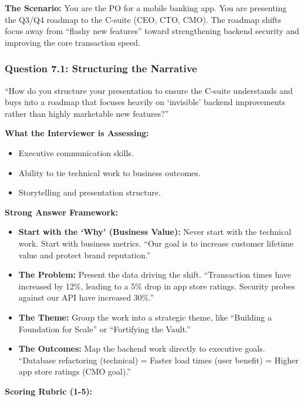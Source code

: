 \documentclass[
  11pt,
  openany,
  oneside]{book}
\providecommand{\tightlist}{%
  \setlength{\itemsep}{0pt}\setlength{\parskip}{0pt}}
\begin{document}
\textbf{The Scenario:} You are the PO for a mobile banking app. You are
presenting the Q3/Q4 roadmap to the C-suite (CEO, CTO, CMO). The roadmap
shifts focus away from ``flashy new features'' toward strengthening
backend security and improving the core transaction speed.

\subsubsection{Question 7.1: Structuring the
Narrative}\label{question-7.1-structuring-the-narrative}

``How do you structure your presentation to ensure the C-suite
understands and buys into a roadmap that focuses heavily on `invisible'
backend improvements rather than highly marketable new features?''

\textbf{What the Interviewer is Assessing:}

\begin{itemize}
\tightlist
\item
  Executive communication skills.
\item
  Ability to tie technical work to business outcomes.
\item
  Storytelling and presentation structure.
\end{itemize}

\textbf{Strong Answer Framework:}

\begin{itemize}
\tightlist
\item
  \textbf{Start with the `Why' (Business Value):} Never start with the
  technical work. Start with business metrics. ``Our goal is to increase
  customer lifetime value and protect brand reputation.''
\item
  \textbf{The Problem:} Present the data driving the shift.
  ``Transaction times have increased by 12\%, leading to a 5\% drop in
  app store ratings. Security probes against our API have increased
  30\%.''
\item
  \textbf{The Theme:} Group the work into a strategic theme, like
  ``Building a Foundation for Scale'' or ``Fortifying the Vault.''
\item
  \textbf{The Outcomes:} Map the backend work directly to executive
  goals. ``Database refactoring (technical) = Faster load times (user
  benefit) = Higher app store ratings (CMO goal).''
\end{itemize}

\textbf{Scoring Rubric (1-5):}
\end{document}

